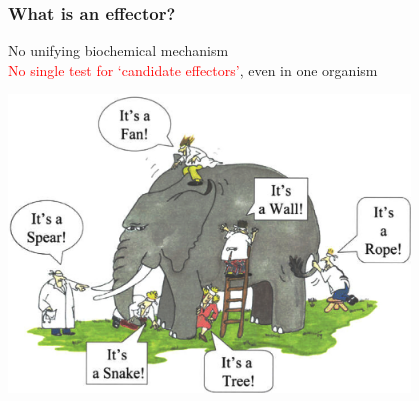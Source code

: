 \begin{frame}
  \frametitle{What is an effector?}
  No unifying biochemical mechanism \\
  \textcolor{red}{No single test for `candidate effectors'}, even in one organism
  \begin{center}
    \includegraphics[width=0.8\textwidth]{images/elephant}    
  \end{center}
\end{frame}


